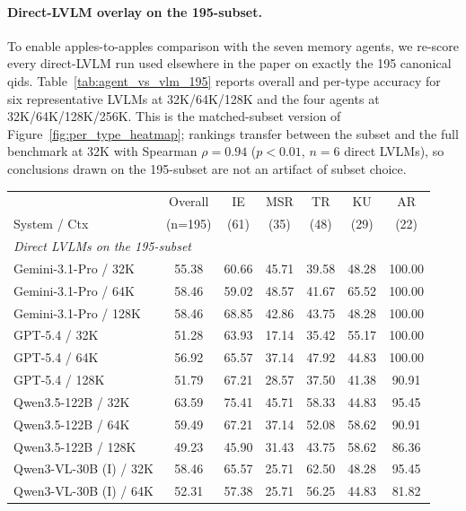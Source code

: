 \documentclass{llmxive}
\begin{document}
\paragraph{Direct-LVLM overlay on the 195-subset.}
To enable apples-to-apples comparison with the seven memory agents, we re-score every direct-LVLM run used elsewhere in the paper on exactly the 195 canonical qids. Table~\ref{tab:agent_vs_vlm_195} reports overall and per-type accuracy for six representative LVLMs at 32K/64K/128K and the four agents at 32K/64K/128K/256K. This is the matched-subset version of Figure~\ref{fig:per_type_heatmap}; rankings transfer between the subset and the full benchmark at 32K with Spearman $\rho = 0.94$ ($p < 0.01$, $n = 6$ direct LVLMs), so conclusions drawn on the 195-subset are not an artifact of subset choice.

\begin{table}[!htbp]
\centering
\scriptsize
\setlength{\tabcolsep}{3pt}
\begin{tabular}{@{}lcccccc@{}}
\toprule
 & Overall & IE & MSR & TR & KU & AR \\
System / Ctx & (n=195) & (61) & (35) & (48) & (29) & (22) \\
\midrule
\multicolumn{7}{l}{\emph{Direct LVLMs on the 195-subset}} \\
Gemini-3.1-Pro / 32K      & 55.38 & 60.66 & 45.71 & 39.58 & 48.28 & 100.00 \\
Gemini-3.1-Pro / 64K      & 58.46 & 59.02 & 48.57 & 41.67 & 65.52 & 100.00 \\
Gemini-3.1-Pro / 128K     & 58.46 & 68.85 & 42.86 & 43.75 & 48.28 & 100.00 \\
GPT-5.4 / 32K             & 51.28 & 63.93 & 17.14 & 35.42 & 55.17 & 100.00 \\
GPT-5.4 / 64K             & 56.92 & 65.57 & 37.14 & 47.92 & 44.83 & 100.00 \\
GPT-5.4 / 128K            & 51.79 & 67.21 & 28.57 & 37.50 & 41.38 &  90.91 \\
\midrule
Qwen3.5-122B / 32K        & 63.59 & 75.41 & 45.71 & 58.33 & 44.83 &  95.45 \\
Qwen3.5-122B / 64K        & 59.49 & 67.21 & 37.14 & 52.08 & 58.62 &  90.91 \\
Qwen3.5-122B / 128K       & 49.23 & 45.90 & 31.43 & 43.75 & 58.62 &  86.36 \\
\midrule
Qwen3-VL-30B (I) / 32K    & 58.46 & 65.57 & 25.71 & 62.50 & 48.28 &  95.45 \\
Qwen3-VL-30B (I) / 64K    & 52.31 & 57.38 & 25.71 & 56.25 & 44.83 &  81.82 \\

\end{tabular}
\end{table}
\end{document}
